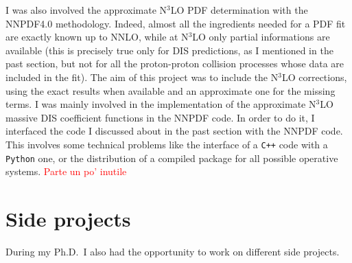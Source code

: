 \documentclass[11pt,a4paper]{moderncv}        %
\begin{document}
I was also involved the approximate N$^3$LO PDF determination with the NNPDF4.0 methodology.
Indeed, almost all the ingredients needed for a PDF fit are exactly known up to NNLO, while at N$^3$LO only partial informations
are available (this is precisely true only for DIS predictions, as I mentioned in the past section, but not for all the proton-proton
collision processes whose data are included in the fit).
The aim of this project was to include the N$^3$LO corrections, using the exact results when available and an approximate one
for the missing terms.
I was mainly involved in the implementation of the approximate N$^3$LO massive DIS coefficient functions in the NNPDF code.
In order to do it, I interfaced the code I discussed about in the past section with the NNPDF code.
This involves some technical problems like the interface of a \texttt{C++} code with a \texttt{Python} one, or the distribution of
a compiled package for all possible operative systems. \textcolor{red}{Parte un po' inutile}


\section{Side projects}

During my Ph.D.\ I also had the opportunity to work on different side projects.

\cite{laurenti2022approximating}


\end{document}
